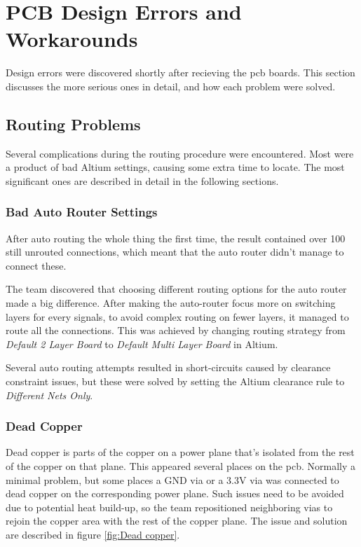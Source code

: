 \section{PCB Design Errors and Workarounds}
Design errors were discovered shortly after recieving the \gls{pcb} boards.
This section discusses the more serious ones in detail, and how each problem were solved.

\subsection{Routing Problems}
\label{Routing Problems}
Several complications during the routing procedure were encountered.
Most were a product of bad Altium settings, causing some extra time to locate.
The most significant ones are described in detail in the following sections.

\subsubsection{Bad Auto Router Settings}
After auto routing the whole thing the first time, the result contained over 100 still unrouted connections,
which meant that the auto router didn't manage to connect these.

The team discovered that choosing different routing options for the auto router made a big difference.
After making the auto-router focus more on switching layers for every signals,
to avoid complex routing on fewer layers, it managed to route all the connections.
This was achieved by changing routing strategy from \emph{Default 2 Layer Board} to \emph{Default Multi Layer Board} in Altium.

Several auto routing attempts resulted in short-circuits caused by clearance constraint issues, but these were solved by setting the Altium clearance rule to \emph{Different Nets Only}.

\subsubsection{Dead Copper}
Dead copper is parts of the copper on a power plane that's isolated from the rest of the copper on that plane.
This appeared several places on the \gls{pcb}. Normally a minimal problem, but some places a GND via or a 3.3V via was connected to dead copper on the corresponding power plane.
Such issues need to be avoided due to potential heat build-up, so the team repositioned neighboring vias to rejoin the copper area with the rest of the copper plane. The issue and solution are described in figure \ref{fig:Dead copper}.

